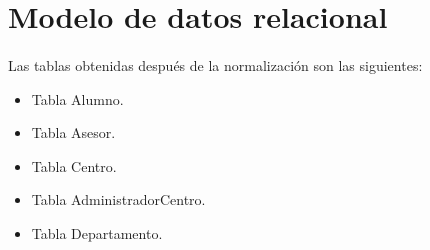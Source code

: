 \section{Modelo de datos relacional}

  \paragraph{}Las tablas obtenidas después de la normalización son las
  siguientes:

  \begin{itemize}
   \item Tabla Alumno.
   \item Tabla Asesor.
   \item Tabla Centro.
   \item Tabla AdministradorCentro.
   \item Tabla Departamento.
  \end{itemize}







